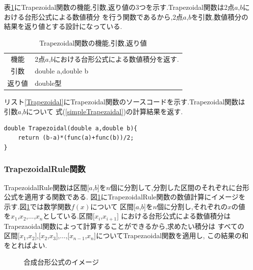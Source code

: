 \documentclass[dvipdfmx]{jarticle}
\begin{document}
    表\ref{Trapezoidaltable}にTrapezoidal関数の機能,引数,返り値の3つを示す.Trapezoidal関数は2点$a$,$b$における台形公式による数値積分
    を行う関数であるから,2点$a$,$b$を引数,数値積分の結果を返り値とする設計になっている.

    \begin{table}[H]
      \caption{Trapezoidal関数の機能,引数,返り値}
      \label{Trapezoidaltable}
      \begin{center}
          \begin{tabular}{c|l}\hline
        機能 & 2点$a$,$b$における台形公式による数値積分を返す.\\
        引数 & double a,double b\\
        返り値 & double型 \\ \hline
          \end{tabular}
      \end{center}
      \end{table}

      リスト\ref{Trapezoidal}にTrapezoidal関数のソースコードを示す.Trapezoidal関数は引数$a$,$b$について
      式(\ref{simpleTrapezaidal})の計算結果を返す.
      \begin{lstlisting}[basicstyle=\ttfamily\footnotesize, frame=single,label=Trapezoidal,caption=Trapezoidal関数]
double Trapezoidal(double a,double b){
    return (b-a)*(func(a)+func(b))/2;
}
            \end{lstlisting}

    \subsubsection{TrapezoidalRule関数}
    TrapezoidalRule関数は区間[$a$,$b$]を$n$個に分割して,分割した区間のそれぞれに台形公式を適用する関数である.
    図\ref{gtrap}にTrapezoidalRule関数の数値計算にイメージを示す.図\ref{gtrap}では数学関数$f(x)$について
    区間[$a$,$b$]を$n$個に分割し,それぞれの$x$の値を$x_1$,$x_2$,$\dots$,$x_n$としている.区間[$x_i$,$x_{i+1}$]
    における台形公式による数値積分はTrapezaoidal関数によって計算することができるから,求めたい積分は
    すべての区間[$x_1$,$x_2$],[$x_2$,$x_3$],$\dots$,[$x_{n-1}$,$x_n$]についてTrapezaoidal関数を適用し,
    この結果の和をとればよい.

    \begin{figure}[H]
      \centering
\caption{合成台形公式のイメージ} 
\label{gtrap}
\end{figure}
\end{document}
